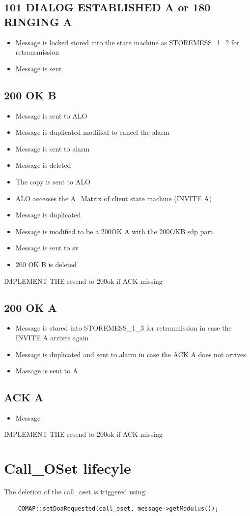 \documentclass[a4paper]{article}
\begin{document}
\subsection{101 DIALOG ESTABLISHED A or 180 RINGING A}
\begin {itemize}
\item Message is locked stored into the state machine as STOREMESS\_1\_2 for retransmission 
\item Message is sent
\end{itemize}

\subsection{200 OK B}
\begin {itemize}
\item Message is sent to ALO
\item Message is duplicated modified to cancel the alarm
\item Message is sent to alarm
\item Message is deleted
\item The copy is sent to ALO
\item ALO accesses the A\_Matrix of client state machine (INVITE A)
\item Message is duplicated
\item Message is modified to be a 200OK A with the 200OKB sdp part
\item Message is sent to sv
\item 200 OK B is deleted
\end{itemize}

IMPLEMENT THE resend to 200ok if ACK missing


\subsection{200 OK A}
\begin {itemize}
\item Message is stored into STOREMESS\_1\_3 for retranmission in case the INVITE A arrives again
\item Message is duplicated and sent to alarm in case the ACK A does not arrives
\item Massage is sent to A
\end{itemize}

\subsection{ACK A}
\begin {itemize}
\item Message 
\end{itemize}

IMPLEMENT THE resend to 200ok if ACK missing

\section{Call\_OSet lifecyle}

The deletion of the call\_oset is triggered using:
\begin{verbatim}
	COMAP::setDoaRequested(call_oset, message->getModulus());
\end{verbatim} 
\end{document}
